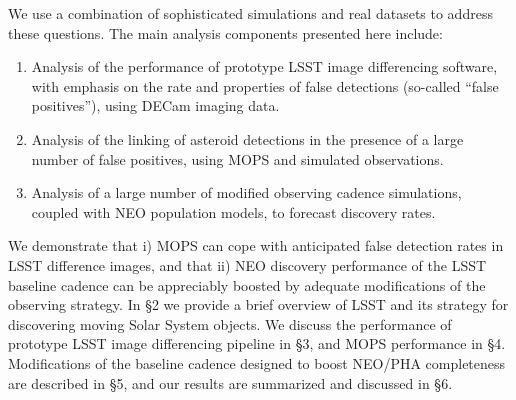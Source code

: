 We use a combination of sophisticated simulations and real datasets to address these questions.
The main analysis components presented here include:
\begin{enumerate}
\item Analysis of the performance of prototype LSST image differencing software, with emphasis on the rate and
    properties of false detections (so-called ``false positives''), using DECam imaging data.
\item Analysis of the linking of asteroid detections in the presence of a large number of false positives, using MOPS
         and simulated observations.
\item Analysis of a large number of modified observing cadence simulations, coupled with NEO population
          models, to forecast discovery rates.
\end{enumerate}

We demonstrate that i) MOPS can cope with anticipated false detection rates
in LSST difference images, and that ii) NEO discovery performance of the LSST baseline cadence
can be appreciably boosted by adequate modifications of the observing strategy.
In \S2 we provide a brief overview of LSST and its strategy for discovering moving Solar
System objects. We discuss the performance of prototype LSST image differencing pipeline
in \S3, and MOPS performance in \S4. Modifications of the baseline cadence designed to
boost NEO/PHA completeness are described in \S5, and our results are summarized and
discussed in \S6.
